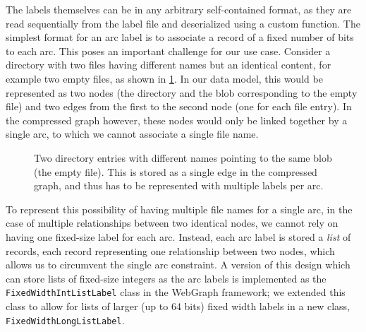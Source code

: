 
The labels themselves can be in any arbitrary self-contained format, as they
are read sequentially from the label file and deserialized using a custom
function. The simplest format for an arc label is to associate a record of a
fixed number of bits to each arc. This poses an important challenge for
our use case. Consider a directory with two files having different names but
an identical content, for example two empty files, as shown in
\cref{fig:multiple-labels}. In our data model, this would be represented as two
nodes (the directory and the blob corresponding to the empty file) and two
edges from the first to the second node (one for each file entry). In the
compressed graph however, these nodes would only be linked together by a single
arc, to which we cannot associate a single file name.

\begin{figure}
    \centering
    \caption{Two directory entries with different names pointing to the same
        blob (the empty file). This is stored as a single edge in the
        compressed graph, and thus has to be represented with multiple labels per
    arc.}%
    \label{fig:multiple-labels}
\end{figure}

To represent this possibility of having multiple file names for a single arc,
in the case of multiple relationships between two identical nodes, we cannot
rely on having one fixed-size label for each arc. Instead, each arc label is
stored a \emph{list} of records, each record representing one relationship
between two nodes, which allows us to circumvent the single arc constraint.
A version of this design which can store lists of fixed-size integers as the
arc labels is implemented as the \texttt{FixedWidthIntListLabel} class in the
WebGraph framework; we extended this class to allow for lists of larger (up to
64 bits) fixed width labels in a new class, \texttt{FixedWidthLongListLabel}.


